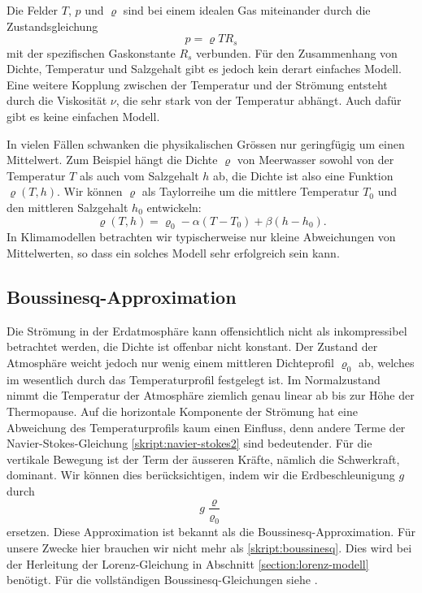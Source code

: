 Die Felder $T$, $p$ und $\varrho$ sind bei einem idealen Gas miteinander
durch die Zustandsgleichung
\[
p=\varrho T R_s
\]
mit der spezifischen Gaskonstante $R_s$ verbunden.
Für den Zusammenhang von Dichte, Temperatur und Salzgehalt gibt
es jedoch kein derart einfaches Modell.
Eine weitere Kopplung zwischen der Temperatur und der
Strömung entsteht durch die Viskosität $\nu$, die sehr stark
von der Temperatur abhängt.
Auch dafür gibt es keine einfachen Modell.

In vielen Fällen schwanken die physikalischen Grössen nur geringfügig
um einen Mittelwert.
Zum Beispiel hängt die Dichte $\varrho$ von Meerwasser sowohl von
der Temperatur $T$ als auch vom Salzgehalt $h$ ab, die Dichte ist
also eine Funktion $\varrho(T,h)$.
Wir können $\varrho$ als Taylorreihe um die mittlere Temperatur $T_0$
und den mittleren Salzgehalt $h_0$ entwickeln:
\[
\varrho(T,h)
=
\varrho_0 -\alpha(T-T_0) + \beta(h-h_0).
\]
In Klimamodellen betrachten wir typischerweise nur kleine Abweichungen
von Mittelwerten, so dass ein solches Modell sehr erfolgreich sein kann.

\subsection{Boussinesq-Approximation}
Die Strömung in der Erdatmosphäre kann offensichtlich nicht als
inkompressibel betrachtet werden, die Dichte ist offenbar nicht
konstant.
Der Zustand der Atmosphäre weicht jedoch nur wenig einem mittleren
Dichteprofil $\varrho_0$ ab, welches im wesentlich durch das Temperaturprofil
festgelegt ist.
Im Normalzustand nimmt die Temperatur der Atmosphäre ziemlich genau
linear ab bis zur Höhe der Thermopause.
Auf die horizontale Komponente der Strömung hat eine Abweichung des
Temperaturprofils kaum einen Einfluss, denn andere Terme der
Navier-Stokes-Gleichung
\eqref{skript:navier-stokes2}
sind bedeutender.
Für die vertikale Bewegung ist der Term der äusseren Kräfte,
nämlich die Schwerkraft, dominant.
Wir können dies berücksichtigen, indem wir die Erdbeschleunigung
$g$ durch
\begin{equation}
g\frac{\varrho}{\varrho_0}
\label{skript:boussinesq}
\end{equation}
ersetzen.
Diese Approximation ist bekannt als die Boussinesq-Approximation.
Für unsere Zwecke hier brauchen wir nicht mehr als \eqref{skript:boussinesq}.
Dies wird bei der Herleitung der Lorenz-Gleichung in Abschnitt
\ref{section:lorenz-modell} benötigt.
Für die vollständigen Boussinesq-Gleichungen siehe \cite{skript:kaperengler}.

